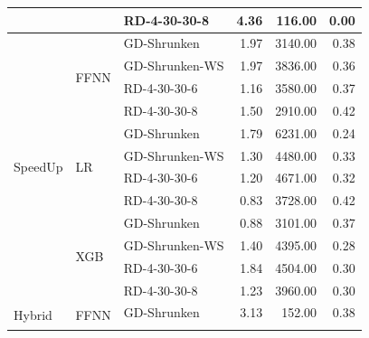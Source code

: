 \begin{table}[ht]
\begin{tabular}{lllrrr}
		                             &                          & RD-4-30-30-8     & 4.36         & 116.00              & 0.00                    \\\midrule
		\multirow[t]{12}{*}{SpeedUp} & \multirow[t]{4}{*}{FFNN} & GD-Shrunken      & 1.97         & 3140.00             & 0.38                    \\\cmidrule(lr){3-6}
		                             &                          & GD-Shrunken-WS   & 1.97         & 3836.00             & 0.36                    \\\cmidrule(lr){3-6}
		                             &                          & RD-4-30-30-6     & 1.16         & 3580.00             & 0.37                    \\\cmidrule(lr){3-6}
		                             &                          & RD-4-30-30-8     & 1.50         & 2910.00             & 0.42                    \\\cmidrule(lr){2-6}
		                             & \multirow[t]{4}{*}{LR}   & GD-Shrunken      & 1.79         & 6231.00             & 0.24                    \\\cmidrule(lr){3-6}
		                             &                          & GD-Shrunken-WS   & 1.30         & 4480.00             & 0.33                    \\\cmidrule(lr){3-6}
		                             &                          & RD-4-30-30-6     & 1.20         & 4671.00             & 0.32                    \\\cmidrule(lr){3-6}
		                             &                          & RD-4-30-30-8     & 0.83         & 3728.00             & 0.42                    \\\cmidrule(lr){2-6}
		                             & \multirow[t]{4}{*}{XGB}  & GD-Shrunken      & 0.88         & 3101.00             & 0.37                    \\\cmidrule(lr){3-6}
		                             &                          & GD-Shrunken-WS   & 1.40         & 4395.00             & 0.28                    \\\cmidrule(lr){3-6}
		                             &                          & RD-4-30-30-6     & 1.84         & 4504.00             & 0.30                    \\\cmidrule(lr){3-6}
		                             &                          & RD-4-30-30-8     & 1.23         & 3960.00             & 0.30                    \\\midrule
		\multirow[t]{12}{*}{Hybrid}  & \multirow[t]{4}{*}{FFNN} & GD-Shrunken      & 3.13         & 152.00              & 0.38                    \\\cmidrule(lr){3-6}

\end{tabular}
\end{table}
